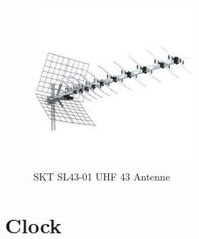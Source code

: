 \begin{figure}
    \centering
    \includegraphics[width=\textwidth]{images/antenne.png}
    \caption{SKT SL43-01 UHF 43  Antenne}\label{antenne}
\end{figure}

\section{Clock}